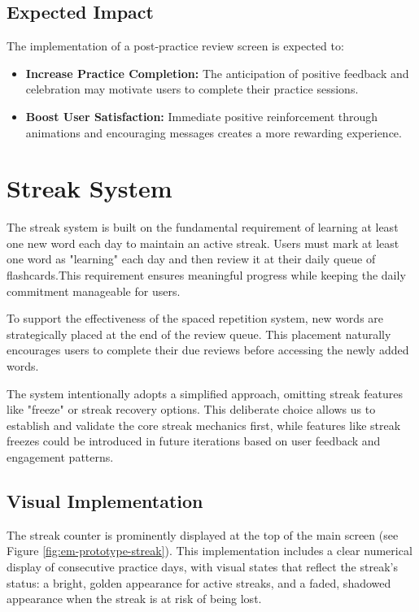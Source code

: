 \subsection*{Expected Impact}

The implementation of a post-practice review screen is expected to:

\begin{itemize}
    \item \textbf{Increase Practice Completion:} The anticipation of positive feedback and celebration may motivate users to complete their practice sessions.
    
    \item \textbf{Boost User Satisfaction:} Immediate positive reinforcement through animations and encouraging messages creates a more rewarding experience.
\end{itemize}

\section{Streak System}

The streak system is built on the fundamental requirement of learning at least one new word each day to maintain an active streak. Users must mark at least one word as "learning" each day and then review it at their daily queue of flashcards.This requirement ensures meaningful progress while keeping the daily commitment manageable for users. 

To support the effectiveness of the spaced repetition system, new words are strategically placed at the end of the review queue. This placement naturally encourages users to complete their due reviews before accessing the newly added words.

The system intentionally adopts a simplified approach, omitting streak features like "freeze" or streak recovery options. This deliberate choice allows us to establish and validate the core streak mechanics first, while features like streak freezes could be introduced in future iterations based on user feedback and engagement patterns.

\subsection*{Visual Implementation}

The streak counter is prominently displayed at the top of the main screen (see Figure \ref{fig:em-prototype-streak}). This implementation includes a clear numerical display of consecutive practice days, with visual states that reflect the streak's status: a bright, golden appearance for active streaks, and a faded, shadowed appearance when the streak is at risk of being lost.

